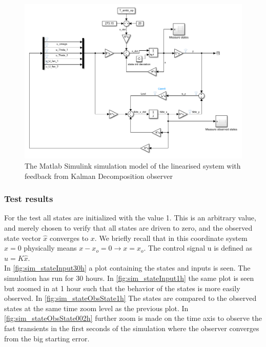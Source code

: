 \begin{figure}[h!]
	\centering
	\includegraphics[width=1\textwidth]{Graphics/fig_modelSS_obs.png}
	\caption{The Matlab Simulink simulation model of the linearised system with feedback from Kalman Decomposition observer}
	\label{fig:sim_modelSS_obs}
\end{figure}

\subsubsection{Test results}

For the test all states are initialized with the value 1. This is an arbitrary value, and merely chosen to verify that all states are driven to zero, and the observed state vector $\hat{x}$ converges to $x$. We briefly recall that in this coordinate system $x=0$ physically means $x-x_o = 0 \rightarrow x=x_o$. The control signal u is defined as $u=K\hat{x}$.\\

In \cref{fig:sim_stateInput30h} a plot containing the states and inputs is seen. The simulation has run for 30 hours. In \cref{fig:sim_stateInput1h} the same plot is seen but zoomed in at 1 hour such that the behavior of the states is more easily observed. In \cref{fig:sim_stateObsState1h} The states are compared to the observed states at the same time zoom level as the previous plot. In \cref{fig:sim_stateObsState002h} further zoom is made on the time axis to observe the fast transients in the first seconds of the simulation where the observer converges from the big starting error.


